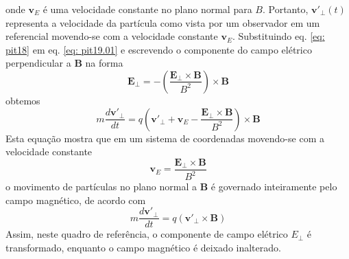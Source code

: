 \documentclass[12pt,oneside,a4paper]{abntex2}
\begin{document}
onde $\bm{v}_E$ é uma velocidade constante no plano normal para $B$. Portanto, $\bm{v'}_{\bot}(t)$ representa a velocidade da partícula como vista por um observador em um referencial movendo-se com a velocidade constante $\bm{v}_E$. Substituindo eq. \ref{eq: pit18} em eq. \ref{eq: pit19.01} e escrevendo o componente do campo elétrico perpendicular a $\bm{B}$ na forma
\begin{equation}
\bm{E}_{\bot} = -(\frac{\bm{E}_{\bot} \times \bm{B}}{B^2}) \times \bm{B}
\end{equation}
obtemos
\begin{equation}
m \frac{d\bm{v'}_{\bot}}{dt}=q(\bm{v'}_{\bot}+\bm{v}_{E}-\frac{\bm{E}_{\bot} \times \bm{B}}{B^2}) \times \bm{B}
\end{equation}
Esta equação mostra que em um sistema de coordenadas movendo-se com a velocidade constante
\begin{equation}
\bm{v}_{E} = \frac{\bm{E}_{\bot} \times \bm{B}}{B^2}
\end{equation}
o movimento de partículas no plano normal a $\bm{B}$ é governado inteiramente pelo campo magnético, de acordo com
\begin{equation}
m \frac{d\bm{v'}_{\bot}}{dt} = q(\bm{v'}_{\bot} \times \bm{B})
\end{equation}
Assim, neste quadro de referência, o componente de campo elétrico $E_{\bot}$ é transformado, enquanto o campo magnético é deixado inalterado.
\end{document}
